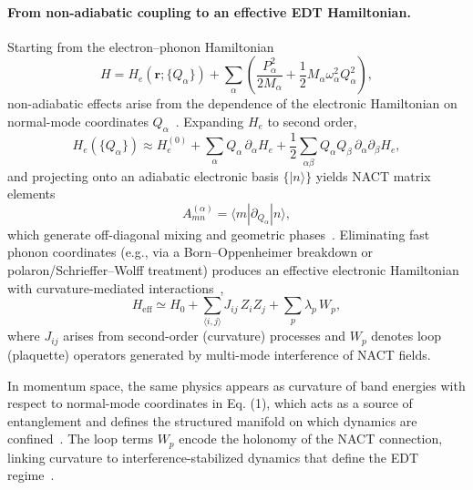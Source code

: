 \documentclass[twocolumn,10pt]{article}
\begin{document}
\paragraph*{From non-adiabatic coupling to an effective EDT Hamiltonian.}

Starting from the electron--phonon Hamiltonian
\begin{equation}
H = H_e(\mathbf{r};\{Q_\alpha\}) + \sum_\alpha \left(\frac{P_\alpha^2}{2M_\alpha} + \frac{1}{2} M_\alpha \omega_\alpha^2 Q_\alpha^2\right),
\end{equation}
non-adiabatic effects arise from the dependence of the electronic Hamiltonian on normal-mode coordinates $Q_\alpha$~\cite{BornOppenheimer1927,Mead1979,Yarkony1996}. Expanding $H_e$ to second order,
\begin{equation}
H_e(\{Q_\alpha\}) \approx H_e^{(0)} + \sum_\alpha Q_\alpha \,\partial_\alpha H_e
+ \frac{1}{2}\sum_{\alpha\beta} Q_\alpha Q_\beta \,\partial_\alpha \partial_\beta H_e,
\end{equation}
and projecting onto an adiabatic electronic basis $\{|n\rangle\}$ yields NACT matrix elements
\begin{equation}
A^{(\alpha)}_{mn} = \langle m | \partial_{Q_\alpha} | n \rangle,
\end{equation}
which generate off-diagonal mixing and geometric phases~\cite{Mead1979,Berry1984}. Eliminating fast phonon coordinates (e.g., via a Born--Oppenheimer breakdown or polaron/Schrieffer--Wolff treatment) produces an effective electronic Hamiltonian with curvature-mediated interactions~\cite{SchriefferWolff1966,LangFirsov1962},
\begin{equation}
H_{\mathrm{eff}} \simeq H_0 + \sum_{\langle i,j\rangle} J_{ij}\, Z_i Z_j
+ \sum_p \lambda_p\, W_p,
\end{equation}
where $J_{ij}$ arises from second-order (curvature) processes and $W_p$ denotes loop (plaquette) operators generated by multi-mode interference of NACT fields.

In momentum space, the same physics appears as curvature of band energies with respect to normal-mode coordinates in Eq. (1), which acts as a source of entanglement and defines the structured manifold on which dynamics are confined~\cite{BardeenPines1955,BCS1957}. The loop terms $W_p$ encode the holonomy of the NACT connection, linking curvature to interference-stabilized dynamics that define the EDT regime~\cite{Berry1984,Xiao2010}.

\end{document}
